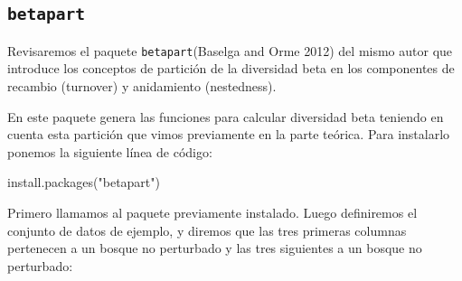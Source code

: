 \documentclass[
]{article}
\newenvironment{Shaded}{\begin{snugshade}}{\end{snugshade}}
\newcommand{\FunctionTok}[1]{\textcolor[rgb]{0.00,0.00,0.00}{#1}}
\newcommand{\NormalTok}[1]{#1}
\newcommand{\StringTok}[1]{\textcolor[rgb]{0.31,0.60,0.02}{#1}}
\begin{document}
\hypertarget{betapart}{%
\subsection{\texorpdfstring{\texttt{betapart}}{betapart}}\label{betapart}}

Revisaremos el paquete \texttt{betapart}(Baselga and Orme 2012) del
mismo autor que introduce los conceptos de partición de la diversidad
beta en los componentes de recambio (turnover) y anidamiento
(nestedness).

En este paquete genera las funciones para calcular diversidad beta
teniendo en cuenta esta partición que vimos previamente en la parte
teórica. Para instalarlo ponemos la siguiente línea de código:

\begin{Shaded}
\begin{Highlighting}[]
\FunctionTok{install.packages}\NormalTok{(}\StringTok{"betapart"}\NormalTok{)}
\end{Highlighting}
\end{Shaded}

Primero llamamos al paquete previamente instalado. Luego definiremos el
conjunto de datos de ejemplo, y diremos que las tres primeras columnas
pertenecen a un bosque no perturbado y las tres siguientes a un bosque
no perturbado:
\end{document}
